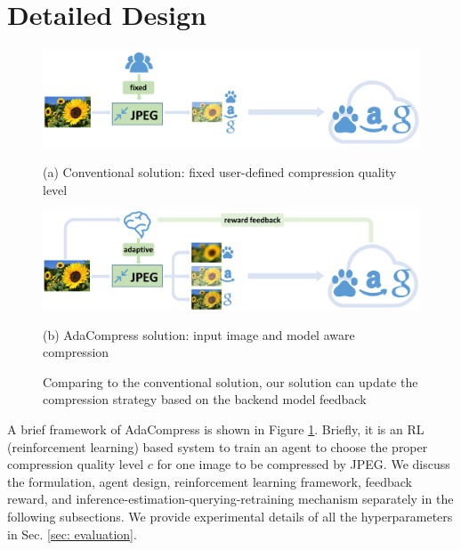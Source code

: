 \section{Detailed Design}
\label{sec: design}

\begin{figure}
    \begin{minipage}{\linewidth}
        \centerline{\includegraphics[width=0.8\linewidth]{figures/conventional-framework.pdf}}
        \begin{center}
            {(a) Conventional solution: fixed user-defined compression quality level}
        \end{center}
    \end{minipage}
    \vfill
    \vspace{0.4cm}
    \begin{minipage}{\linewidth}
        \centerline{\includegraphics[width=0.8\linewidth]{figures/adaptive-framework.pdf}}
        \vspace{0.2cm}
        \begin{center}
            {(b) AdaCompress solution: input image and model aware compression}
        \end{center}
    \end{minipage}
    \vspace{0.1cm}
    \caption{Comparing to the conventional solution, our solution can update the compression strategy based on the backend model feedback}
    \label{fig: framework}
\end{figure}

A brief framework of AdaCompress is shown in Figure \ref{fig: framework}. Briefly, it is an RL (reinforcement learning) based system to train an agent to choose the proper compression quality level $ c $ for one image to be compressed by JPEG. We discuss the formulation, agent design, reinforcement learning framework, feedback reward, and inference-estimation-querying-retraining mechanism separately in the following subsections. We provide experimental details of all the hyperparameters in Sec. \ref{sec: evaluation}. %


